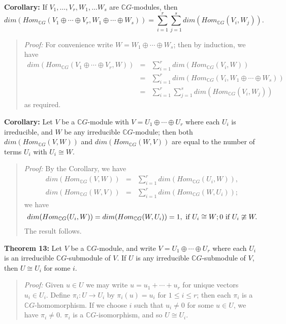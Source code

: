 {\bf Corollary:} If $V_1,\dots,V_r,W_1,\dots W_s$ are
${\mathbb C}G$-modules, then
$$dim(Hom_{{\mathbb C}G}(V_1\oplus\cdots\oplus V_r,W_1\oplus\cdots\oplus W_s))
=\sum_{i=1}^r\sum_{j=1}^s dim(Hom_{{\mathbb C}G}(V_i,W_j)).$$
\begin{quote}
\emph{Proof:}
For convenience write $W=W_1\oplus\cdots\oplus W_s$; then by induction,
we have
\begin{eqnarray*}
dim(Hom_{{\mathbb C}G}(V_1\oplus\cdots\oplus V_r,W))
\!\!\!\!&=&\!\!\!\!\sum_{i=1}^r dim(Hom_{{\mathbb C}G}(V_i,W))\\
\!\!\!\!&=&\!\!\!\!\sum_{i=1}^r dim(Hom_{{\mathbb C}G}(V_i,W_1\oplus\cdots\oplus W_s))\\
\!\!\!\!&=&\!\!\!\!\sum_{i=1}^r\sum_{j=1}^s dim(Hom_{{\mathbb C}G}(V_i,W_j))
\end{eqnarray*}
as required.
\end{quote}
{\bf Corollary:} Let $V$ be a ${\mathbb C}G$-module with
$V=U_1\oplus\cdots\oplus U_r$ where each $U_i$ is irreducible, and $W$ be any
irreducible ${\mathbb C}G$-module; then both $ dim(Hom_{{\mathbb C}G}(V,W))$ and
$ dim(Hom_{{\mathbb C}G}(W,V))$ are equal to the number of terms $U_i$ with $U_i\cong W$.
\begin{quote}
\emph{Proof:}
By the Corollary, we have
\begin{eqnarray*}
 dim(Hom_{{\mathbb C}G}(V,W))\!\!\!\!&=&\!\!\!\!\sum_{i=1}^r dim(Hom_{{\mathbb C}G}(U_i,W)),\\
 dim(Hom_{{\mathbb C}G}(W,V))\!\!\!\!&=&\!\!\!\!\sum_{i=1}^r dim(Hom_{{\mathbb C}G}(W,U_i));
\end{eqnarray*}
we have
$$ dim(Hom_{{\mathbb C}G}(U_i,W))= dim(Hom_{{\mathbb C}G}(W,U_i))=
1,  \textnormal { if } U_i \cong W;
0  \textnormal{ if } U_i \ncong W.
$$
The result follows.
\end{quote}
{\bf Theorem 13:} Let $V$ be a ${\mathbb C}G$-module, and write
$V=U_1\oplus\cdots\oplus U_r$ where each $U_i$ is an irreducible
${\mathbb C}G$-submodule of $V$. If $U$ is any irreducible ${\mathbb C}G$-submodule of $V$, then
$U \cong U_i$ for some $i$.
\begin{quote}
\emph{Proof:}
Given $u\in U$ we may write $u=u_1+\cdots+u_r$ for unique vectors
$u_i\in U_i$. Define $\pi_i:U\rightarrow U_i$ by $\pi_i(u)=u_i$ for
$1\leq i\leq r$; then each $\pi_i$ is a
${\mathbb C}G$-homomorphism. If we choose $i$ such that $u_i\neq0$ for some
$u\in U$, we have $\pi_i\neq0$. $\pi_i$ is a
${\mathbb C}G$-isomorphism, and so $U\cong U_i$.
\end{quote}
